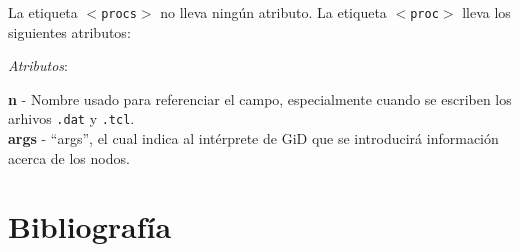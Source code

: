 \documentclass[10pt, a4paper, twocolumn]{article} %
\begin{document}
La etiqueta \texttt{$<$procs$>$} no lleva ningún atributo. La etiqueta \texttt{$<$proc$>$} lleva los siguientes atributos:

\vspace{0.15cm}
\textit{Atributos}:

\vspace{0.15cm}
	\textbf{n} - Nombre usado para referenciar el campo, especialmente cuando se escriben los arhivos \texttt{.dat} y \texttt{.tcl}.\\
	\textbf{args} - ``args'', el cual indica al intérprete de GiD que se introducirá información acerca de los nodos.\\
\vspace{0.15cm}


\section{Bibliografía}


\end{document}
